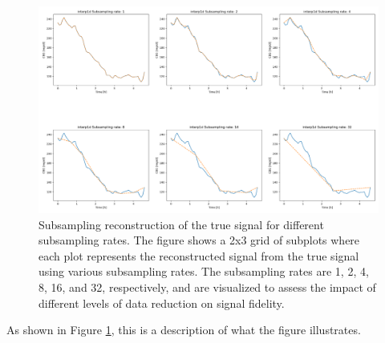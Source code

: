 \begin{figure}[ht] %
	\centering
	\includegraphics[width=\textwidth]{Figures/SR_combined.png} %
	\caption{Subsampling reconstruction of the true signal for different subsampling rates. The figure shows a 2x3 grid of subplots where each plot represents the reconstructed signal from the true signal using various subsampling rates. The subsampling rates are 1, 2, 4, 8, 16, and 32, respectively, and are visualized to assess the impact of different levels of data reduction on signal fidelity.}
	\label{fig:SR_combined}  %
\end{figure}

As shown in Figure \ref{fig:SR_combined}, this is a description of what the figure illustrates.


